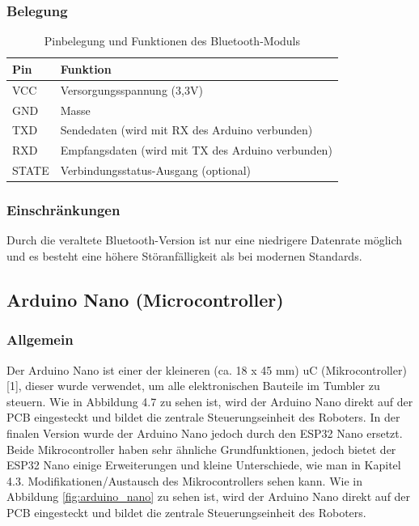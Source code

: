 \subsubsection{Belegung}
\begin{table}[h]
    \centering
    \begin{tabular}{|l|p{10cm}|}
    \hline
    \textbf{Pin} & \textbf{Funktion} \\
    \hline
    VCC    & Versorgungsspannung (3,3V) \\
    GND    & Masse \\
    TXD    & Sendedaten (wird mit RX des Arduino verbunden) \\
    RXD    & Empfangsdaten (wird mit TX des Arduino verbunden) \\
    STATE  & Verbindungsstatus-Ausgang (optional) \\
    \hline
    \end{tabular}
    \caption{Pinbelegung und Funktionen des Bluetooth-Moduls}
    \end{table}

\subsubsection{Einschränkungen}
Durch die veraltete Bluetooth-Version ist nur eine niedrigere Datenrate möglich
und es besteht eine höhere Störanfälligkeit als bei modernen Standards.
%
\subsection{Arduino Nano (Microcontroller)}
%
\subsubsection{Allgemein}
Der Arduino Nano ist einer der kleineren (ca. 18 x 45 mm) uC (Mikrocontroller) [1], dieser wurde verwendet, um alle elektronischen Bauteile im Tumbler zu steuern. Wie in Abbildung 4.7 zu sehen ist, wird der Arduino Nano direkt auf der PCB eingesteckt und bildet die zentrale Steuerungseinheit des Roboters. In der finalen Version wurde der Arduino Nano jedoch durch den ESP32 Nano ersetzt. Beide Mikrocontroller haben sehr ähnliche Grundfunktionen, jedoch bietet der ESP32 Nano einige Erweiterungen und kleine Unterschiede, wie man in Kapitel 4.3. Modifikationen/Austausch des Mikrocontrollers sehen kann.%
Wie in Abbildung \ref{fig:arduino_nano} zu sehen ist,
wird der Arduino Nano direkt auf der PCB eingesteckt und bildet die zentrale Steuerungseinheit des Roboters.
